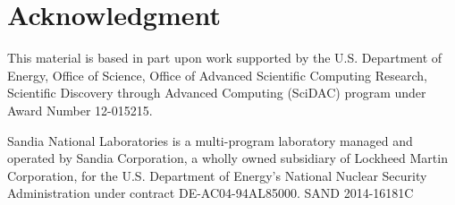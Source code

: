 \documentclass[conference]{IEEEtran}
\begin{document}
\section*{Acknowledgment}

\noindent
This material is based in part upon work supported by the U.S. Department
of Energy, Office of Science, Office of Advanced Scientific Computing
Research, Scientific Discovery through Advanced Computing (SciDAC) program
under Award Number 12-015215.

Sandia National Laboratories is a multi-program laboratory managed and
operated by Sandia Corporation, a wholly owned subsidiary of Lockheed
Martin Corporation, for the U.S. Department of Energy's National Nuclear
Security Administration under contract DE-AC04-94AL85000. \hfill
{\footnotesize SAND 2014-16181C}



\end{document}

